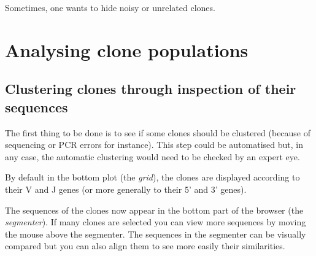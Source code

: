 \documentclass[11pt]{article}
\begin{document}


Sometimes, one wants to hide noisy or unrelated clones.



  
\section{Analysing clone populations}

\subsection{Clustering clones through inspection of their sequences}

The first thing to be done is to see if some clones should be clustered (because
of sequencing or PCR errors for instance). This step could be automatised
but, in any case, the automatic clustering would need to be checked by an expert
eye.

By default in the bottom plot (the \textit{grid}), the clones
  are displayed according to their V and J genes (or more generally to their
  5' and 3' genes). 


The sequences of the clones now appear in the bottom part of the browser (the
\textit{segmenter}). If many clones are selected you can view more sequences
by moving the mouse above the segmenter.
The sequences in the segmenter can be visually compared but you can also align
them to see more easily their similarities.
\end{document}
